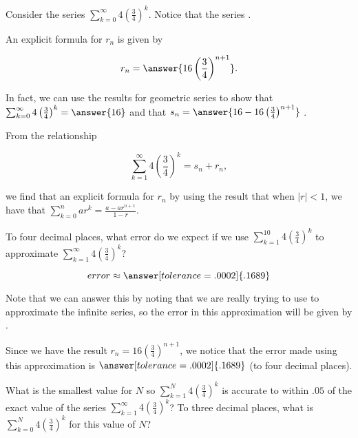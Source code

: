 \documentclass{ximera}
\author{Jim Talamo}
\begin{document}
\begin{exercise}

Consider the series $\sum_{k=0}^{\infty} 4\left(\frac{3}{4}\right)^k$.  Notice that the series .

\begin{exercise}
An explicit formula for $r_n$ is given by

\[
r_n = \answer{16\left(\frac{3}{4}\right)^{n+1}}.
\]

\begin{hint}
In fact, we can use the results for geometric series to show that  $\sum_{k=0}^{\infty} 4\left(\frac{3}{4}\right)^k = \answer{16}$ and that $s_n = \answer{16-16\left(\frac{3}{4}\right)^{n+1}}$ .

From the relationship 

\[
\sum_{k=1}^{\infty} 4\left(\frac{3}{4}\right)^k = s_n+r_n,
\]

we find that an explicit formula for $r_n$ by using the result that when $|r|<1$, we have that $\sum_{k=0}^n ar^k = \frac{a-ar^{n+1}}{1-r}$.  
\end{hint}

\begin{exercise}
To four decimal places, what error do we expect if we use $\sum_{k=1}^{10} 4\left(\frac{3}{4}\right)^k $ to approximate $\sum_{k=1}^{\infty} 4\left(\frac{3}{4}\right)^k$? 

\[
error \approx \answer[tolerance=.0002]{.1689}
\] 


\begin{hint}
Note that we can answer this by noting that we are really trying to use  to approximate the infinite series, so the error in this approximation will be given by .

Since we have the result $r_n = 16\left(\frac{3}{4}\right)^{n+1}$, we notice that the error made using this approximation is $\answer[tolerance=.0002]{.1689}$ (to four decimal places).

\end{hint}

\end{exercise}
\begin{exercise}
What is the smallest value for $N$ so $\sum_{k=1}^{N} 4\left(\frac{3}{4}\right)^k $ is accurate to within $.05$ of the exact value of the series $\sum_{k=1}^{\infty} 4\left(\frac{3}{4}\right)^k $?  To three decimal places, what is $\sum_{k=0}^N 4\left(\frac{3}{4}\right)^k$ for this value of $N$?


\end{exercise}
\end{exercise}
\end{exercise}
\end{document}
